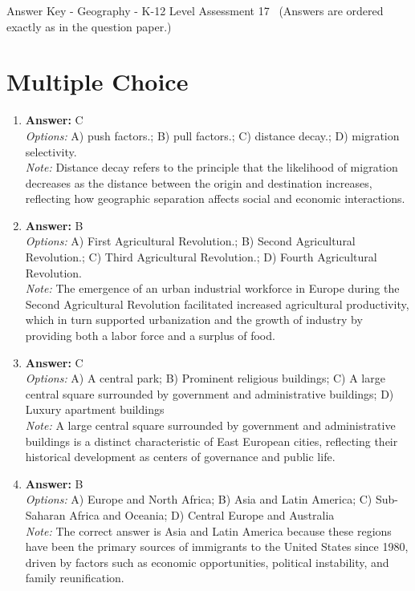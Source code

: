 \documentclass[12pt]{article}
\begin{document}
\begin{center}
Answer Key - Geography - K-12 Level Assessment 17 \
\small (Answers are ordered exactly as in the question paper.)
\end{center}

\section*{Multiple Choice}
\begin{enumerate}[label=\arabic*.]
\item \textbf{Answer:} C
\\ \textit{Options:} A) push factors.; B) pull factors.; C) distance decay.; D) migration selectivity.
\\ \textit{Note:} Distance decay refers to the principle that the likelihood of migration decreases as the distance between the origin and destination increases, reflecting how geographic separation affects social and economic interactions.
\item \textbf{Answer:} B
\\ \textit{Options:} A) First Agricultural Revolution.; B) Second Agricultural Revolution.; C) Third Agricultural Revolution.; D) Fourth Agricultural Revolution.
\\ \textit{Note:} The emergence of an urban industrial workforce in Europe during the Second Agricultural Revolution facilitated increased agricultural productivity, which in turn supported urbanization and the growth of industry by providing both a labor force and a surplus of food.
\item \textbf{Answer:} C
\\ \textit{Options:} A) A central park; B) Prominent religious buildings; C) A large central square surrounded by government and administrative buildings; D) Luxury apartment buildings
\\ \textit{Note:} A large central square surrounded by government and administrative buildings is a distinct characteristic of East European cities, reflecting their historical development as centers of governance and public life.
\item \textbf{Answer:} B
\\ \textit{Options:} A) Europe and North Africa; B) Asia and Latin America; C) Sub-Saharan Africa and Oceania; D) Central Europe and Australia
\\ \textit{Note:} The correct answer is Asia and Latin America because these regions have been the primary sources of immigrants to the United States since 1980, driven by factors such as economic opportunities, political instability, and family reunification.

\end{enumerate}
\end{document}
